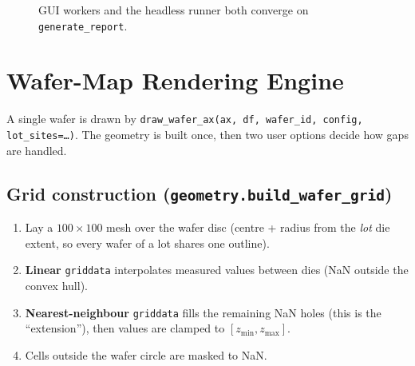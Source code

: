 \documentclass[11pt,a4paper]{article}
\newcommand{\code}[1]{\texttt{#1}}
\begin{document}
\begin{figure}[h]\centering
{}
\caption{GUI workers and the headless runner both converge on \texttt{generate\_report}.}
\end{figure}

\section{Wafer-Map Rendering Engine}
\label{sec:render}
A single wafer is drawn by \code{draw_wafer_ax(ax, df, wafer_id, config,
lot_sites=\dots)}. The geometry is built once, then two user options decide how
gaps are handled.

\subsection{Grid construction (\texttt{geometry.build\_wafer\_grid})}
\begin{enumerate}[nosep,leftmargin=1.6em]
\item Lay a $100\times100$ mesh over the wafer disc (centre + radius from the
\emph{lot} die extent, so every wafer of a lot shares one outline).
\item \textbf{Linear} \code{griddata} interpolates measured values between dies
(NaN outside the convex hull).
\item \textbf{Nearest-neighbour} \code{griddata} fills the remaining NaN holes
(this is the ``extension''), then values are clamped to $[z_{\min},z_{\max}]$.
\item Cells outside the wafer circle are masked to NaN.
\end{enumerate}
\end{document}
